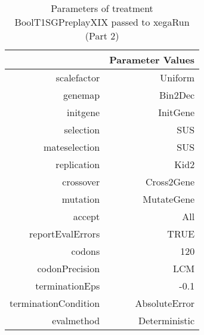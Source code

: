 \begin{table}[ht]
\centering
\begin{tabular}{rr}
  \hline
 & Parameter Values \\ 
  \hline
scalefactor & Uniform \\ 
  genemap & Bin2Dec \\ 
  initgene & InitGene \\ 
  selection & SUS \\ 
  mateselection & SUS \\ 
  replication & Kid2 \\ 
  crossover & Cross2Gene \\ 
  mutation & MutateGene \\ 
  accept & All \\ 
  reportEvalErrors & TRUE \\ 
  codons & 120 \\ 
  codonPrecision & LCM \\ 
  terminationEps & -0.1 \\ 
  terminationCondition & AbsoluteError \\ 
  evalmethod & Deterministic \\ 
   \hline
\end{tabular}
\caption{ Parameters of treatment BoolT1SGPreplayXIX passed to xegaRun
 (Part 2)} 
\end{table}

